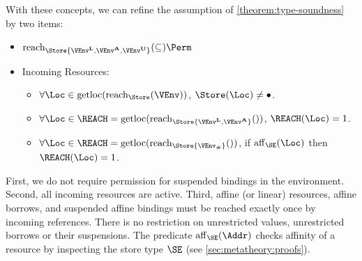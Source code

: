 With these concepts, we can refine the assumption of
\cref{theorem:type-soundness} by two items:
\begin{itemize}
\item $\Reach\Store{\Active\VEnv, \MutableBorrows\VEnv, \ImmutableBorrows\VEnv} \subseteq \Perm$
  \item Incoming Resources: 
    \begin{itemize}
    \item $\forall \Loc\in \Rawloc{\Reach\Store\VEnv}$,  $\Store (\Loc) \ne
      \StFreed$.
    \item $\forall \Loc \in \REACH
      =\Rawloc{\Reach\Store{\Active\VEnv,\MutableBorrows\VEnv}}$, 
      $\MultiNumber\Loc\REACH= 1$.
    \item $\forall \Loc \in \REACH
      =\Rawloc{\Reach\Store{\Suspended\VEnv}}$, 
      if $\Affine\SE\Loc$ then
      $\MultiNumber\Loc\REACH= 1$.
    \end{itemize}
\end{itemize}
First, we do not require permission for suspended bindings in the
environment. Second, all incoming resources are active. Third, affine
(or linear) resources, affine borrows, and suspended affine bindings
must be reached exactly once by incoming references. There is no
restriction on unrestricted values, unrestricted borrows or their
suspensions.  The predicate $\Affine{\SE}\Addr$ checks affinity of a
resource by inspecting the store type $\SE$ (see
\cref{sec:metatheory:proofs}).

